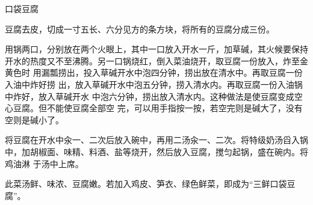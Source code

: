 %
%
%
%
%
%
%
\begin{recipe}{口袋豆腐}

\ingredients


\preparation

\step 豆腐去皮，切成一寸五长、六分见方的条方块，将所有的豆腐分成三份。

\step 用锅两口，分别放在两个火眼上，其中一口放入开水一斤，加草碱，其火候要保持
开水的热度又不至沸腾。另一口锅烧红，倒入菜油烧开，取豆腐一份放入，炸至金黄色时
用漏瓢捞出，投入草碱开水中泡四分钟，捞出放在清水中。再取豆腐一份入油中炸好捞
出，放入草碱开水中泡五分钟，捞入清水内。再取豆腐一份入油锅中炸好，放入草碱开水
中泡六分钟，捞出放入清水内。这种做法是使豆腐变成空心豆腐。但不能使豆腐全部空
完，可以用手指按一按，若空完则是碱大了，没有空则是碱小了。

\step 将豆腐在开水中汆一、二次后放入碗中，再用二汤汆一、二次。将特级奶汤舀入锅
中，加胡椒面、味精、料酒、盐等烧开，然后放入豆腐，搅匀起锅，盛在碗内。将鸡油淋
于汤中上席。

\features

此菜汤鲜、味浓、豆腐嫩。若加入鸡皮、笋衣、绿色鲜菜，即成为“三鲜口袋豆腐”。

\end{recipe}

